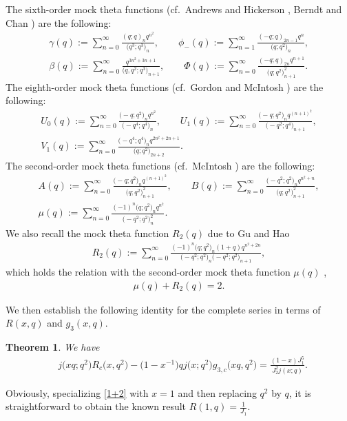 \documentclass[pdftex]{sigma}
\numberwithin{equation}{section}
\newtheorem{Theorem}{Theorem}[section]
\begin{document}
The sixth-order mock theta functions (cf.\ Andrews and Hickerson \cite{AH}, Berndt and Chan \cite{BC}) are the following:
\begin{gather*}
\gamma(q):=\sum_{n=0}^{\infty}\frac{(q;q)_nq^{n^2}}{\bigl(q^3;q^3\bigr)_n},\qquad
\phi_-(q):=\sum_{n=1}^{\infty}\frac{(-q;q)_{2n-1}q^n}{\bigl(q;q^2\bigr)_n},\\
\beta(q):=\sum_{n=0}^{\infty}\frac{q^{3n^2+3n+1}}{\bigl(q,q^2;q^3\bigr)_{n+1}},\qquad
\varPhi(q):=\sum_{n=0}^{\infty}\frac{(-q;q)_{2n}q^{n+1}}{\bigl(q;q^2\bigr)_{n+1}^2}.
\end{gather*}
The eighth-order mock theta functions (cf.\ Gordon and McIntosh \cite{GM2})  are the following:
\begin{gather*}
U_0(q):=\sum_{n=0}^{\infty}\frac{\bigl(-q;q^2\bigr)_nq^{n^2}}{\bigl(-q^4;q^4\bigr)_n},\qquad
U_1(q):=\sum_{n=0}^{\infty}\frac{\bigl(-q;q^2\bigr)_nq^{(n+1)^2}}
{\bigl(-q^2;q^4\bigr)_{n+1}},\\
V_1(q):=\sum_{n=0}^{\infty}\frac{\bigl(-q^4;q^4\bigr)_n q^{2n^2+2n+1}}{\bigl(q;q^2\bigr)_{2n+2}}.
\end{gather*}
The second-order mock theta functions (cf.\ McIntosh \cite{McI}) are the following:
\begin{gather*}
A(q):=\sum_{n=0}^{\infty}\frac{\bigl(-q;q^2\bigr)_n q^{(n+1)^2}}{\bigl(q;q^2\bigr)_{n+1}^2},\qquad
B(q):=\sum_{n=0}^{\infty}\frac{\bigl(-q^2;q^2\bigr)_n q^{n^2+n}}{\bigl(q;q^2\bigr)_{n+1}^2},\\
\mu(q):=\sum_{n=0}^{\infty}\frac{(-1)^n\bigl(q;q^2\bigr)_nq^{n^2}}{\bigl(-q^2;q^2\bigr)_n^2}.
\end{gather*}
We also recall the mock theta function $R_2(q)$ due to Gu and Hao \cite{GH}
\begin{align*}
R_2(q):=\sum_{n=0}^{\infty}\frac{(-1)^n\bigl(q;q^2\bigr)_n(1+q)q^{n^2+2n}}
{\bigl(-q^2;q^2\bigr)_n\bigl(-q^2;q^2\bigr)_{n+1}},
\end{align*}
which holds the relation with the second-order mock theta function $\mu(q)$ \cite[equation~(1.7)]{GH},
\begin{align*}
\mu(q)+R_2(q)=2.
\end{align*}

We then establish the following identity for the complete series in terms of $R(x,q)$ and $g_3(x,q)$.
\begin{Theorem}\label{3+2}
We have
\begin{align}\label{1+2}
&j\bigl(xq;q^2\bigr)R_c\bigl(x,q^2\bigr)-\bigl(1-x^{-1}\bigr)qj\bigl(x;q^2\bigr)g_{3,c}\bigl(xq,q^2\bigr)
=\frac{(1-x)J_1^5}{J_2^2j(x;q)}.
\end{align}
\end{Theorem}
Obviously, specializing \eqref{1+2} with $x=1$ and then replacing $q^2$ by $q$, it is straightforward to obtain the known result
$
R(1,q)=\frac{1}{J_1}$.
\end{document}
